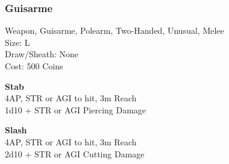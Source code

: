 \subsubsection{Guisarme}\label{weapon:guisarme}
Weapon, Guisarme, Polearm, Two-Handed, Unusual, Melee\\
Size: L\\
Draw/Sheath: None\\
Cost: 500 Coins

\textbf{Stab}\\
4AP, STR or AGI to hit, 3m Reach\\
1d10 + \texttimes STR or AGI Piercing Damage

\textbf{Slash}\\
4AP, STR or AGI to hit, 3m Reach\\
2d10 + \texttimes STR or AGI Cutting Damage
